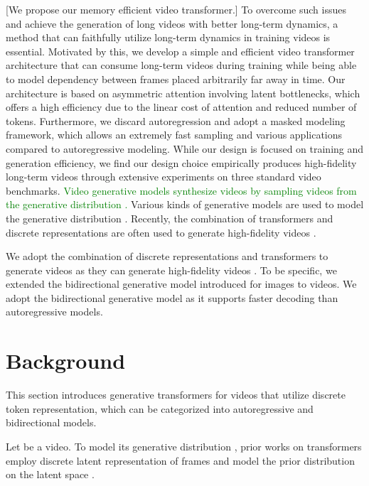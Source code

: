\documentclass[10pt,twocolumn,letterpaper]{article}
\newcommand{\warn}[1]{\textcolor{green}{#1}}
\newcommand{\cutparagraphup}{\vspace*{-0.1in}}
\begin{document}
[We propose our memory efficient video transformer.]
To overcome such issues and achieve the generation of long videos with better long-term dynamics, a method that can faithfully utilize long-term dynamics in training videos is essential.
Motivated by this, we develop a simple and efficient video transformer architecture that can consume long-term videos during training while being able to model dependency between frames placed arbitrarily far away in time.
Our architecture is based on asymmetric attention involving latent bottlenecks, which offers a high efficiency due to the linear cost of attention and reduced number of tokens.
Furthermore, we discard autoregression and adopt a masked modeling framework, which allows an extremely fast sampling and various applications compared to autoregressive modeling.
While our design is focused on training and generation efficiency, we find our design choice empirically produces high-fidelity long-term videos through extensive experiments on three standard video benchmarks.
\fi \iffalse
\ifdefined\paratitle {\color{blue}
[Discrete representation with transformers can synthesize high-fidelity videos.] \\
} \fi
\warn{Video generative models synthesize videos  by sampling videos  from the generative distribution .} Various kinds of generative models are used to model the generative distribution .
Recently, the combination of transformers and discrete representations are often used to generate high-fidelity videos \cite{TATS, videoGPT}.

\ifdefined{} \fi
We adopt the combination of discrete representations and transformers to generate videos as they can generate high-fidelity videos \cite{VideoGPT, TATS}. To be specific, we extended the bidirectional generative model \cite{MaskGIT} introduced for images to videos. We adopt the bidirectional generative model as it supports faster decoding than autoregressive models.
\fi

\section{Background}
This section introduces generative transformers for videos that utilize discrete token representation, which can be categorized into autoregressive and bidirectional models.

Let  be a video.
To model its generative distribution , prior works on transformers employ discrete latent representation of frames  and model the prior distribution on the latent space .
\cutparagraphup
\end{document}
